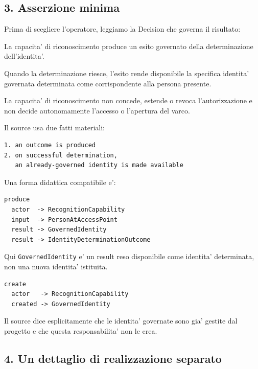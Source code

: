 \documentclass[11pt,a4paper]{article}
\newcommand{\code}[1]{\nolinkurl{#1}}
\begin{document}
\subsection{3. Asserzione minima}

Prima di scegliere l'operatore, leggiamo la Decision che governa il risultato:

\begin{sourcebox}[D-3.2 CANDIDATE R2]
La capacita' di riconoscimento produce un esito governato della determinazione dell'identita'.

Quando la determinazione riesce, l'esito rende disponibile la specifica identita' governata determinata come corrispondente alla persona presente.

La capacita' di riconoscimento non concede, estende o revoca l'autorizzazione e non decide autonomamente l'accesso o l'apertura del varco.
\end{sourcebox}

Il source usa due fatti materiali:

\begin{lstlisting}
1. an outcome is produced
2. on successful determination,
   an already-governed identity is made available
\end{lstlisting}

Una forma didattica compatibile e':

\begin{lstlisting}
produce
  actor  -> RecognitionCapability
  input  -> PersonAtAccessPoint
  result -> GovernedIdentity
  result -> IdentityDeterminationOutcome
\end{lstlisting}

Qui \code{GovernedIdentity} e' un result reso disponibile come identita' determinata, non una nuova identita' istituita.

\begin{badbox}
\begin{lstlisting}
create
  actor   -> RecognitionCapability
  created -> GovernedIdentity
\end{lstlisting}
Il source dice esplicitamente che le identita' governate sono gia' gestite dal progetto e che questa responsabilita' non le crea.
\end{badbox}

\subsection{4. Un dettaglio di realizzazione separato}
\end{document}

